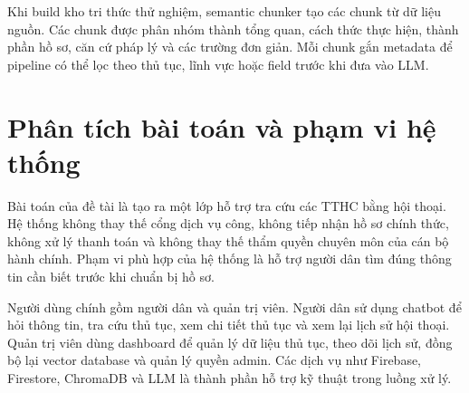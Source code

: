 Khi build kho tri thức thử nghiệm, semantic chunker tạo các chunk từ dữ
liệu nguồn. Các chunk được phân nhóm thành tổng quan, cách thức thực
hiện, thành phần hồ sơ, căn cứ pháp lý và các trường đơn giản. Mỗi chunk
gắn metadata để pipeline có thể lọc theo thủ tục, lĩnh vực hoặc field
trước khi đưa vào LLM.

\section{Phân tích bài toán và phạm vi hệ
thống}

Bài toán của đề tài là tạo ra một lớp hỗ trợ tra cứu các TTHC bằng hội
thoại. Hệ thống không thay thế cổng dịch vụ công, không tiếp nhận hồ sơ
chính thức, không xử lý thanh toán và không thay thế thẩm quyền chuyên
môn của cán bộ hành chính. Phạm vi phù hợp của hệ thống là hỗ trợ người
dân tìm đúng thông tin cần biết trước khi chuẩn bị hồ sơ.

Người dùng chính gồm người dân và quản trị viên. Người dân sử dụng
chatbot để hỏi thông tin, tra cứu thủ tục, xem chi tiết thủ tục và xem
lại lịch sử hội thoại. Quản trị viên dùng dashboard để quản lý dữ liệu
thủ tục, theo dõi lịch sử, đồng bộ lại vector database và quản lý quyền
admin. Các dịch vụ như Firebase, Firestore, ChromaDB và LLM là thành
phần hỗ trợ kỹ thuật trong luồng xử lý.

